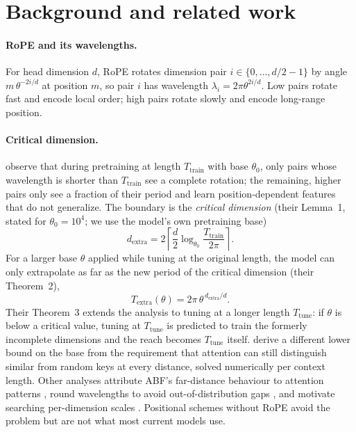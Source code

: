 \documentclass[11pt]{article}
\begin{document}
\section{Background and related work}
\label{sec:related}

\paragraph{RoPE and its wavelengths.} For head dimension $d$, RoPE rotates dimension pair $i\in\{0,\dots,d/2-1\}$ by angle $m\,\theta^{-2i/d}$ at position $m$, so pair $i$ has wavelength $\lambda_i=2\pi\theta^{2i/d}$. Low pairs rotate fast and encode local order; high pairs rotate slowly and encode long-range position.

\paragraph{Critical dimension.} \citet{liu2024scalinglaws} observe that during pretraining at length $T_{\mathrm{train}}$ with base $\theta_0$, only pairs whose wavelength is shorter than $T_{\mathrm{train}}$ see a complete rotation; the remaining, higher pairs only see a fraction of their period and learn position-dependent features that do not generalize. The boundary is the \emph{critical dimension} (their Lemma~1, stated for $\theta_0=10^4$; we use the model's own pretraining base)
\begin{equation}
d_{\mathrm{extra}} = 2\left\lceil \frac{d}{2}\log_{\theta_0}\frac{T_{\mathrm{train}}}{2\pi}\right\rceil .
\label{eq:dextra}
\end{equation}
For a larger base $\theta$ applied while tuning at the original length, the model can only extrapolate as far as the new period of the critical dimension (their Theorem~2),
\begin{equation}
T_{\mathrm{extra}}(\theta) = 2\pi\,\theta^{\,d_{\mathrm{extra}}/d}.
\label{eq:textra}
\end{equation}
Their Theorem~3 extends the analysis to tuning at a longer length $T_{\mathrm{tune}}$: if $\theta$ is below a critical value, tuning at $T_{\mathrm{tune}}$ is predicted to train the formerly incomplete dimensions and the reach becomes $T_{\mathrm{tune}}$ itself. \citet{men2024base} derive a different lower bound on the base from the requirement that attention can still distinguish similar from random keys at every distance, solved numerically per context length. Other analyses attribute ABF's far-distance behaviour to attention patterns \citep{zhong2024attention}, round wavelengths to avoid out-of-distribution gaps \citep{wang2024resonance}, and motivate searching per-dimension scales \citep{shang2025longrope2}. Positional schemes without RoPE \citep{press2022alibi,kazemnejad2023nope} avoid the problem but are not what most current models use.
\end{document}
